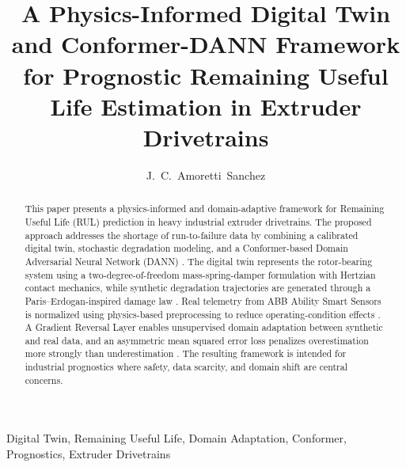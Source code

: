 \documentclass[journal,10pt,a4paper]{IEEEtran}
\begin{document}
\title{A Physics-Informed Digital Twin and Conformer-DANN Framework for Prognostic Remaining Useful Life Estimation in Extruder Drivetrains}
\author{J.~C.~Amoretti~Sanchez}

\maketitle

\begin{abstract}
This paper presents a physics-informed and domain-adaptive framework for Remaining Useful Life (RUL) prediction in heavy industrial extruder drivetrains. The proposed approach addresses the shortage of run-to-failure data by combining a calibrated digital twin, stochastic degradation modeling, and a Conformer-based Domain Adversarial Neural Network (DANN) \cite{tao2018digitaltwin,ganin2016domain,gulati2020conformer}. The digital twin represents the rotor-bearing system using a two-degree-of-freedom mass-spring-damper formulation with Hertzian contact mechanics, while synthetic degradation trajectories are generated through a Paris--Erdogan-inspired damage law \cite{hertz1882,paris_law,stochastic_paris}. Real telemetry from ABB Ability Smart Sensors is normalized using physics-based preprocessing to reduce operating-condition effects \cite{abbsmartsensor}. A Gradient Reversal Layer enables unsupervised domain adaptation between synthetic and real data, and an asymmetric mean squared error loss penalizes overestimation more strongly than underestimation \cite{asymmetric_loss}. The resulting framework is intended for industrial prognostics where safety, data scarcity, and domain shift are central concerns.
\end{abstract}

\begin{IEEEkeywords}
Digital Twin, Remaining Useful Life, Domain Adaptation, Conformer, Prognostics, Extruder Drivetrains
\end{IEEEkeywords}
\end{document}
